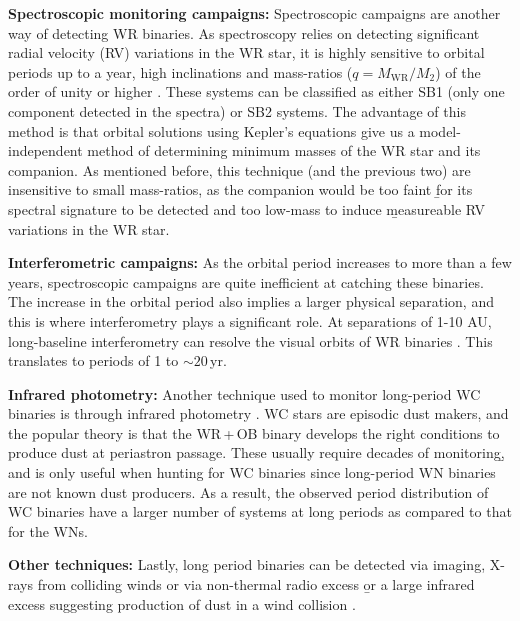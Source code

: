 \textbf{Spectroscopic monitoring campaigns:} Spectroscopic campaigns are another way of detecting WR binaries. As spectroscopy relies on detecting significant radial velocity (RV) variations in the WR star, it is highly sensitive to orbital periods up to a year, high inclinations and mass-ratios ($q=M_\textrm{WR}/M_2$) of the order of unity or higher \citep[see e.g.,][]{1998Marchenko1998WR141,2012David-Uraz,2021Richardson}. These systems can be classified as either SB1 (only one component detected in the spectra) or SB2 systems. The advantage of this method is that orbital solutions using Kepler's equations give us a model-independent method of determining minimum masses of the WR star and its companion. As mentioned before, this technique (and the previous two) are insensitive to small mass-ratios, as the companion would be too faint \b{for its spectral signature to be detected} and too low-mass to induce \b{measureable} RV variations in the WR star.

\textbf{Interferometric campaigns:} As the orbital period increases to more than a few years, spectroscopic campaigns are quite inefficient at catching these binaries. The increase in the orbital period also implies a larger physical separation, and this is where interferometry plays a significant role. At separations of 1-10 AU, long-baseline interferometry can resolve the visual orbits of WR binaries \citep[e.g. for WR 113 and WR 140, respectively:][]{2021Richardson,thomas_orbit_2021}. This translates to periods of 1 to ${\sim}20\,$yr.

\textbf{Infrared photometry:} Another technique used to monitor long-period WC binaries is through infrared photometry \citep{1995Williamsdust,1999MarchenkoDust,2001WilliamsDust,2005Williams,2019WilliamsNEOWISE}. WC stars are episodic dust makers, and the popular theory is that the WR\,+\,OB binary develops the right conditions to produce dust at periastron passage. These usually require decades of monitoring\b{, and is only useful when hunting for WC binaries since long-period WN binaries are not known dust producers. As a result, the observed period distribution of WC binaries have a larger number of systems at long periods as compared to that for the WNs.}

\textbf{Other techniques:} Lastly, long period binaries can be detected via imaging, X-rays from colliding winds or via non-thermal radio excess \b{or a large infrared excess suggesting production of dust in a wind collision} \citep[e.g.][]{1996Dougherty, 2000Dougherty, 2017Zhekov,2020Rodriguez, 2020Zhekov}.

